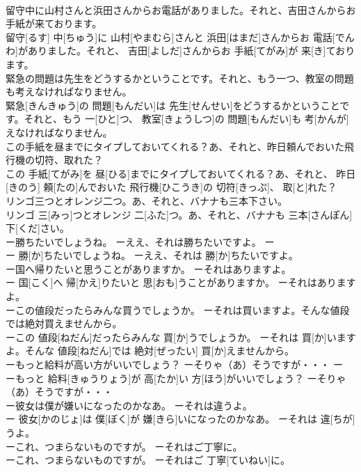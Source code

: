\documentclass[8pt]{extreport}
\begin{document}
\begin{CJK}{UTF8}{min}
\\	留守中に山村さんと浜田さんからお電話がありました。それと、吉田さんからお手紙が来ております。	
\\	留守[るす] 中[ちゅう]に 山村[やまむら]さんと 浜田[はまだ]さんからお 電話[でんわ]がありました。それと、 吉田[よしだ]さんからお 手紙[てがみ]が 来[き]ております。
\\	緊急の問題は先生をどうするかということです。それと、もう一つ、教室の問題も考えなければなりません。	
\\	緊急[きんきゅう]の 問題[もんだい]は 先生[せんせい]をどうするかということです。それと、もう 一[ひと]つ、 教室[きょうしつ]の 問題[もんだい]も 考[かんが]えなければなりません。
\\	この手紙を昼までにタイプしておいてくれる？あ、それと、昨日頼んでおいた飛行機の切符、取れた？	
\\	この 手紙[てがみ]を 昼[ひる]までにタイプしておいてくれる？あ、それと、 昨日[きのう] 頼[たの]んでおいた 飛行機[ひこうき]の 切符[きっぷ]、 取[と]れた？
\\	リンゴ三つとオレンジ二つ。あ、それと、バナナも三本下さい。	
\\	リンゴ 三[みっ]つとオレンジ 二[ふた]つ。あ、それと、バナナも 三本[さんぽん] 下[くだ]さい。
\\	ー勝ちたいでしょうね。 ーええ、それは勝ちたいですよ。	ー
\\	ー 勝[か]ちたいでしょうね。 ーええ、それは 勝[か]ちたいですよ。
\\	ー国へ帰りたいと思うことがありますか。 ーそれはありますよ。	
\\	ー 国[こく]へ 帰[かえ]りたいと 思[おも]うことがありますか。 ーそれはありますよ。
\\	ーこの値段だったらみんな買うでしょうか。 ーそれは買いますよ。そんな値段では絶対買えませんから。	
\\	ーこの 値段[ねだん]だったらみんな 買[か]うでしょうか。 ーそれは 買[か]いますよ。そんな 値段[ねだん]では 絶対[ぜったい] 買[か]えませんから。
\\	ーもっと給料が高い方がいいでしょう？ ーそりゃ（あ）そうですが・・・	ー
\\	ーもっと 給料[きゅうりょう]が 高[たか]い 方[ほう]がいいでしょう？ ーそりゃ（あ）そうですが・・・
\\	ー彼女は僕が嫌いになったのかなあ。 ーそれは違うよ。	
\\	ー 彼女[かのじょ]は 僕[ぼく]が 嫌[きら]いになったのかなあ。 ーそれは 違[ちが]うよ。
\\	ーこれ、つまらないものですが。 ーそれはご丁寧に。	
\\	ーこれ、つまらないものですが。 ーそれはご 丁寧[ていねい]に。

\end{CJK}
\end{document}
